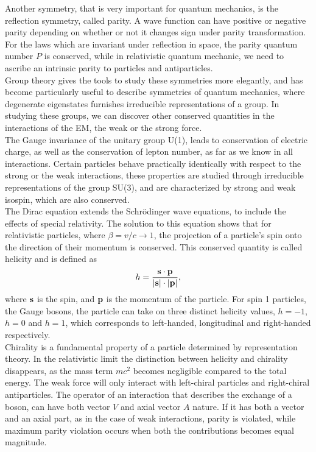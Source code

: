 \documentclass[12pt,a4paper]{article}
\numberwithin{equation}{section}
\begin{document}
Another symmetry, that is very important for quantum mechanics, is the
reflection symmetry, called parity. A wave function can have positive or
negative parity depending on whether or not it changes sign under parity
transformation. For the laws which are invariant under reflection in space, the
parity quantum number $P$ is conserved, while in relativistic quantum mechanic,
we need to ascribe an intrinsic parity to particles and antiparticles.\\

Group theory gives the tools to study these symmetries more elegantly, and has
become particularly useful to describe symmetries of quantum mechanics, where
degenerate eigenstates furnishes irreducible representations of a group. In
studying these groups, we can discover other conserved quantities in the
interactions of the EM, the weak or the strong force.\\

The Gauge invariance of the unitary group U(1), leads to conservation of
electric charge, as well as the conservation of lepton number, as far as we know
in all interactions. Certain particles behave practically identically with
respect to the strong or the weak interactions, these properties are studied
through irreducible representations of the group SU(3), and are characterized by
strong and weak isospin, which are also conserved.\\

The Dirac equation extends the Schrödinger wave equations, to include the
effects of special relativity. The solution to this equation shows that for
relativistic particles, where $\beta = v/c \rightarrow 1$, the projection of a particle's spin
onto the direction of their momentum is conserved. This conserved quantity is
called helicity\cite[63]{Povh2015} and is defined as
\begin{equation}
  h = \frac{\vb{s \cdot p}}{\abs{\vb s} \cdot \abs{\vb p}},
\end{equation}
where $\vb s$ is the spin, and $\vb p$ is the momentum of the particle. For
spin 1 particles, the Gauge bosons, the particle can take on three distinct
helicity values, $h=-1$, $h=0$ and $h=1$, which corresponds to left-handed,
longitudinal and right-handed respectively.\\

Chirality is a fundamental property of a particle determined by representation
theory. In the relativistic limit the distinction between helicity and chirality
disappears, as the mass term $mc^2$ becomes negligible compared to the total
energy. The weak force will only interact with left-chiral particles and
right-chiral antiparticles. The operator of an interaction that describes the
exchange of a boson, can have both vector $V$ and axial vector $A$ nature. If it
has both a vector and an axial part, as in the case of weak interactions, parity
is violated, while maximum parity violation occurs when both the contributions
becomes equal magnitude.\\
\end{document}
